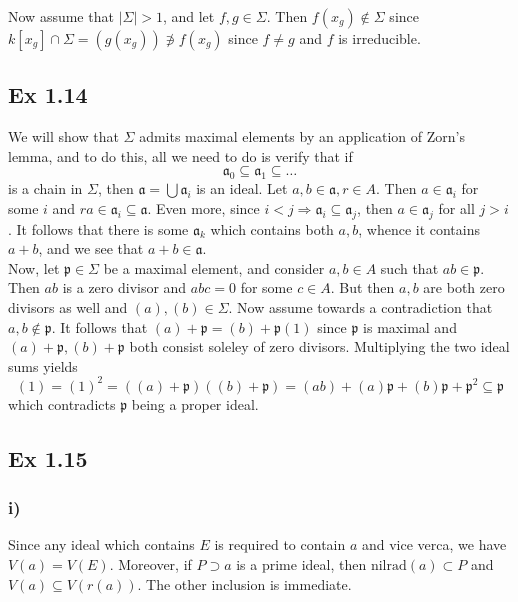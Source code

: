 \documentclass{article}
\theoremstyle{definition}
\newcommand{\nr}{\text{nilrad}}
\begin{document}
Now assume that $|\Sigma| > 1$, and let $f, g \in \Sigma$. Then $f(x_g) \not
\in \Sigma$ since $k[x_g] \cap \Sigma = (g(x_g)) \not \ni f(x_g)$ since $f \not
= g$ and $f$ is irreducible. \\

\subsection*{Ex 1.14}
We will show that $\Sigma$ admits maximal elements by an application of Zorn's
lemma, and to do this, all we need to do is verify that if 
\[
\mathfrak{a}_0 \subseteq \mathfrak{a}_1 \subseteq \dots
\] 
is a chain in $\Sigma$, then $\mathfrak{a} = \bigcup \mathfrak{a}_i$ is an
ideal. Let $a, b \in \mathfrak{a}, r \in A$. Then $a \in \mathfrak{a}_i$ for
some $i$ and $ra \in \mathfrak{a}_i \subseteq \mathfrak{a}$. Even more, since
$i < j \Rightarrow \mathfrak{a}_i \subseteq \mathfrak{a}_j$, then $a \in
\mathfrak{a}_j$ for all $j > i$. It follows that there is some $\mathfrak{a}_k$
which contains both $a, b$, whence it contains $a + b$, and we see that $a + b
\in \mathfrak{a}$. \\

Now, let $\mathfrak{p} \in \Sigma$ be a maximal element, and consider $a, b \in
A$ such that $ab \in \mathfrak{p}$. Then $ab$ is a zero divisor and $abc = 0$
for some $c \in A$. But then $a, b$ are both zero divisors as well and $(a),
(b) \in \Sigma$. Now assume towards a contradiction that $a, b \not \in
\mathfrak{p}$. It follows that $(a) + \mathfrak{p} = (b) + \mathfrak{p} (1)$
since $\mathfrak{p}$ is maximal and $(a) + \mathfrak{p}, (b) + \mathfrak{p}$
both consist soleley of zero divisors. Multiplying the two ideal sums yields
\[
	(1) 
	= 
	(1)^{2} 
	= 
	((a) + \mathfrak{p})((b) + \mathfrak{p}) 
	= 
	(ab) + (a)\mathfrak{p} + (b)\mathfrak{p} + \mathfrak{p}^{2}
	\subseteq
	\mathfrak{p}
\] 
which contradicts $\mathfrak{p}$ being a proper ideal.

\subsection*{Ex 1.15}
\subsubsection*{i)}
Since any ideal which contains $E$ is required to contain $a$ and vice verca,
we have $V(a) = V(E)$. Moreover, if $P \supset a$ is a prime ideal, then
$\nr(a) \subset P$ and $V(a) \subseteq V(r(a))$. The other inclusion is
immediate.
\end{document}
